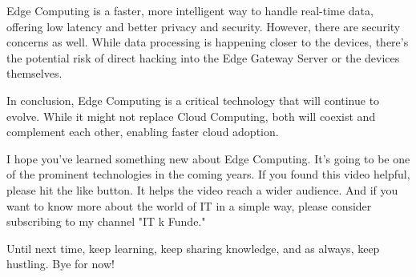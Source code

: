 \documentclass{article}
\begin{document}
Edge Computing is a faster, more intelligent way to handle real-time data, offering low latency and better privacy and security. However, there are security concerns as well. While data processing is happening closer to the devices, there's the potential risk of direct hacking into the Edge Gateway Server or the devices themselves.

In conclusion, Edge Computing is a critical technology that will continue to evolve. While it might not replace Cloud Computing, both will coexist and complement each other, enabling faster cloud adoption.

I hope you’ve learned something new about Edge Computing. It's going to be one of the prominent technologies in the coming years. If you found this video helpful, please hit the like button. It helps the video reach a wider audience. And if you want to know more about the world of IT in a simple way, please consider subscribing to my channel "IT k Funde."

Until next time, keep learning, keep sharing knowledge, and as always, keep hustling. Bye for now!
\end{document}
